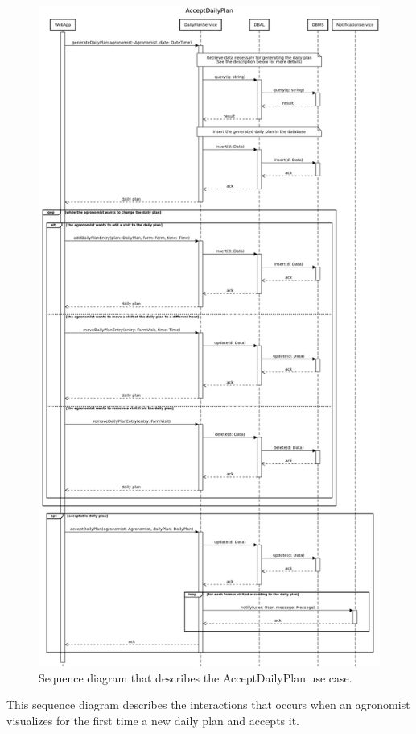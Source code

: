 \documentclass{article}
\begin{document}
\newpage
\begin{figure}[H]
   \centering
   \includegraphics[scale=0.25]{diagrams/sequence diagrams/AcceptDailyPlan.png}
    \caption{Sequence diagram that describes the AcceptDailyPlan use case.}
\end{figure}
This sequence diagram describes the interactions that occurs when an agronomist visualizes for the first time a new daily plan and accepts it. \newline
\end{document}
